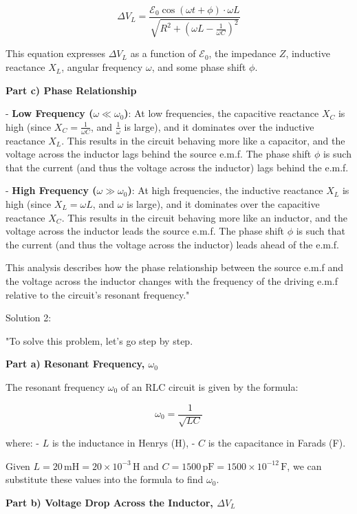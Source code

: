 \[ \Delta V_{L} = \frac{\mathcal{E}_{0} \cos(\omega t + \phi) \cdot \omega L}{\sqrt{R^2 + (\omega L - \frac{1}{\omega C})^2}} \]

This equation expresses \( \Delta V_{L} \) as a function of \(\mathcal{E}_{0}\), the impedance \(Z\), inductive reactance \(X_{L}\), angular frequency \(\omega\), and some phase shift \(\phi\).

\textbf{Part c) Phase Relationship}

- \textbf{Low Frequency (\(\omega \ll \omega_{0}\))}: At low frequencies, the capacitive reactance \(X_{C}\) is high (since \(X_{C} = \frac{1}{\omega C}\), and \(\frac{1}{\omega}\) is large), and it dominates over the inductive reactance \(X_{L}\). This results in the circuit behaving more like a capacitor, and the voltage across the inductor lags behind the source e.m.f. The phase shift \(\phi\) is such that the current (and thus the voltage across the inductor) lags behind the e.m.f.

- \textbf{High Frequency (\(\omega \gg \omega_{0}\))}: At high frequencies, the inductive reactance \(X_{L}\) is high (since \(X_{L} = \omega L\), and \(\omega\) is large), and it dominates over the capacitive reactance \(X_{C}\). This results in the circuit behaving more like an inductor, and the voltage across the inductor leads the source e.m.f. The phase shift \(\phi\) is such that the current (and thus the voltage across the inductor) leads ahead of the e.m.f.

This analysis describes how the phase relationship between the source e.m.f and the voltage across the inductor changes with the frequency of the driving e.m.f relative to the circuit's resonant frequency."

Solution 2:

"To solve this problem, let's go step by step.

\textbf{Part a) Resonant Frequency, \( \omega_{0} \)}

The resonant frequency \(\omega_{0}\) of an RLC circuit is given by the formula:

\[
\omega_{0} = \frac{1}{\sqrt{LC}}
\]

where:
- \(L\) is the inductance in Henrys (H),
- \(C\) is the capacitance in Farads (F).

Given \(L = 20 \, \text{mH} = 20 \times 10^{-3} \, \text{H}\) and \(C = 1500 \, \text{pF} = 1500 \times 10^{-12} \, \text{F}\), we can substitute these values into the formula to find \(\omega_{0}\).

\textbf{Part b) Voltage Drop Across the Inductor, \( \Delta V_{L} \)}

